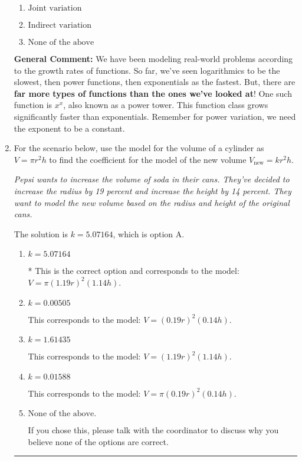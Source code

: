 \documentclass{extbook}[14pt]
\newcommand{\litem}[1]{\item #1

\rule{\textwidth}{0.4pt}}
\begin{document}
\begin{enumerate}
{\begin{enumerate}[label=\Alph*.]
\item \( \text{Joint variation} \)


\item \( \text{Indirect variation} \)


\item \( \text{None of the above} \)


\end{enumerate}

\textbf{General Comment:} We have been modeling real-world problems according to the growth rates of functions. So far, we've seen logarithmics to be the slowest, then power functions, then exponentials as the fastest. But, there are \textbf{far more types of functions than the ones we've looked at}! One such function is $x^x$, also known as a power tower. This function class grows significantly faster than exponentials. Remember for power variation, we need the exponent to be a constant.
}
\litem{
For the scenario below, use the model for the volume of a cylinder as $V = \pi r^2 h$ to find the coefficient for the model of the new volume $V_{\text{new}} = k r^2 h$.

\begin{center}
    \textit{ Pepsi wants to increase the volume of soda in their cans. They've decided to increase the radius by 19 percent and increase the height by 14 percent. They want to model the new volume based on the radius and height of the original cans. }
\end{center}
The solution is \( k = 5.07164 \), which is option A.\begin{enumerate}[label=\Alph*.]
\item \( k = 5.07164 \)

* This is the correct option and corresponds to the model: $V = \pi (1.19 r)^2 (1.14 h)$.
\item \( k = 0.00505 \)

This corresponds to the model: $V = (0.19 r)^2 (0.14 h)$.
\item \( k = 1.61435 \)

This corresponds to the model: $V = (1.19 r)^2 (1.14 h)$.
\item \( k = 0.01588 \)

This corresponds to the model: $V = \pi (0.19 r)^2 (0.14 h)$.
\item \( \text{None of the above.} \)

If you chose this, please talk with the coordinator to discuss why you believe none of the options are correct.
\end{enumerate}

}
\end{enumerate}
\end{document}
